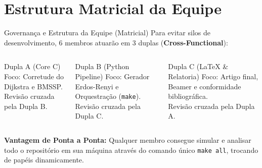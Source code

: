 \documentclass[aspectratio=169, 11pt]{beamer}
\begin{document}
\section{Estrutura Matricial da Equipe}
\begin{frame}{Governança e Estrutura da Equipe (Matricial)}
    Para evitar silos de desenvolvimento, 6 membros atuarão em 3 duplas (\textbf{Cross-Functional}):
    
    \vspace{0.3cm}
    \begin{columns}
        \begin{block}{Dupla A (Core C)}
            Foco: Corretude do Dijkstra e BMSSP. \\
            Revisão cruzada pela Dupla B.
        \end{block}
        
        \begin{block}{Dupla B (Python Pipeline)}
            Foco: Gerador Erdos-Renyi e Orquestração (\texttt{make}). \\
            Revisão cruzada pela Dupla C.
        \end{block}
        
        \begin{block}{Dupla C (LaTeX \& Relatoria)}
            Foco: Artigo final, Beamer e conformidade bibliográfica. \\
            Revisão cruzada pela Dupla A.
        \end{block}
    \end{columns}
    
    \vspace{0.5cm}
    \textbf{Vantagem de Ponta a Ponta:} Qualquer membro consegue simular e analisar todo o repositório em sua máquina através do comando único \texttt{make all}, trocando de papéis dinamicamente.
\end{frame}

\end{document}
